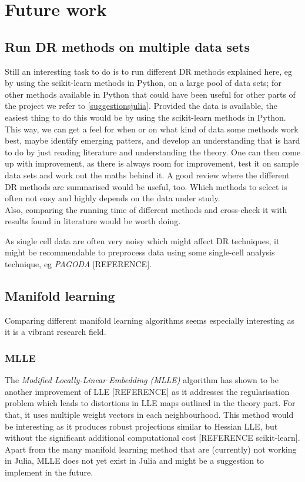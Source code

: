 \documentclass[journal, a4paper]{IEEEtran}
\begin{document}
\section{Future work}

\subsection{Run DR methods on multiple data sets}

Still an interesting task to do is to run different DR methods explained here, eg by using the scikit-learn methods in Python, on a large pool of data sets; for other methods available in Python that could have been useful for other parts of the project we refer to \ref{suggestionsjulia}. Provided the data is available, the easiest thing to do this would be by using the scikit-learn methods in Python. This way, we can get a feel for when or on what kind of data some methods work best, maybe identify emerging patters, and develop an understanding that is hard to do by just reading literature and understanding the theory. One can then come up with improvement, as there is always room for improvement, test it on sample data sets and work out the maths behind it. A good review where the different DR methods are summarised would be useful, too. Which methods to select is often not easy and highly depends on the data under study.\\

Also, comparing the running time of different methods and cross-check it with results found in literature would be worth doing.

As single cell data are often very noisy which might affect DR techniques, it might be recommendable to preprocess data using some single-cell analysis technique, eg \textit{PAGODA} [REFERENCE].


\subsection{Manifold learning}
Comparing different manifold learning algorithms seems especially interesting as it is a vibrant research field.\\

\subsubsection{MLLE}
The \textit{Modified Locally-Linear Embedding (MLLE)} algorithm has shown to be another improvement of LLE [REFERENCE] as it addresses the regularisation problem which leads to distortions in LLE maps outlined in the theory part. For that, it uses multiple weight vectors in each neighbourhood. This method would be interesting as it produces robust projections similar to Hessian LLE, but without the significant additional computational cost [REFERENCE scikit-learn].
Apart from the many manifold learning method that are (currently) not working in Julia, MLLE does not yet exist in Julia and might be a suggestion to implement in the future.\\
\end{document}
